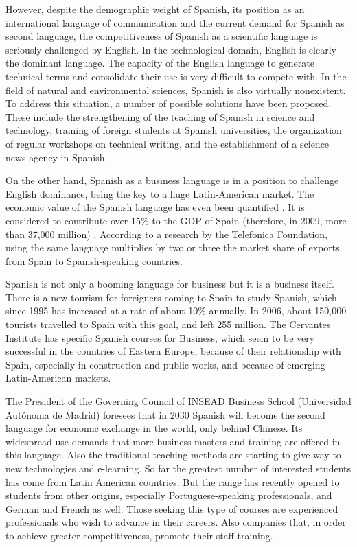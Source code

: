 \begin{multicols}{2}

However, despite the demographic weight of Spanish, its position as an international language of communication and the current demand for Spanish as second language, the competitiveness of Spanish as a scientific language is seriously challenged by English. In the technological domain, English is clearly the dominant language. The capacity of the English language to generate technical terms and consolidate their use is very difficult to compete with. In the field of natural and environmental sciences, Spanish is also virtually nonexistent. To address this situation, a number of possible solutions have been proposed. These include the strengthening of the teaching of Spanish in science and technology, training of foreign students at Spanish universities, the organization of regular workshops on technical writing, and the establishment of a science news agency in Spanish.


On the other hand, Spanish as a business language is in a position to challenge English dominance, being the key to a huge Latin-American market. The economic value of the Spanish language has even been quantified  \cite{ecospanish1}.  It is considered to contribute over 15\% to the GDP of Spain (therefore, in 2009, more than 37,000 million) \cite{ecospanish2}. According to a research by the Telefonica Foundation, using the same language multiplies by two or three the market share of exports from Spain to Spanish-speaking countries.

Spanish is not only a booming language for business but it is a business itself. There is a new tourism for foreigners coming to Spain to study Spanish, which since 1995 has increased at a rate of about 10\% annually.  In 2006, about 150,000 tourists travelled to Spain with this goal, and left 255 million. The Cervantes Institute has specific Spanish courses for Business, which seem to be very successful in the countries of Eastern Europe, because of their relationship with Spain, especially in construction and public works, and because of emerging Latin-American markets.

The President of the Governing Council of INSEAD Business School (Universidad Autónoma de Madrid) foresees that in 2030 Spanish will become the second language for economic exchange in the world, only behind Chinese. Its widespread use demands that more business masters and training are offered in this language. Also the traditional teaching methods are starting to give way to new technologies and e-learning. So far the greatest number of interested students has come from Latin American countries. But the range has recently opened to students from other origins, especially Portuguese-speaking professionals, and German and French as well. Those seeking this type of courses are experienced professionals who wish to advance in their careers. Also companies that, in order to achieve greater competitiveness, promote their staff training.


\end{multicols}
